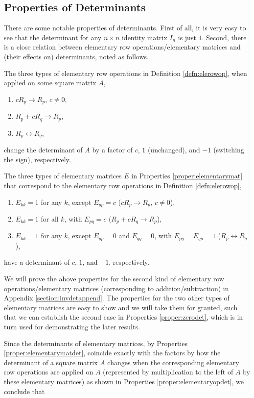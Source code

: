 \subsection{Properties of Determinants} There are some notable properties of determinants. First of all, it is very easy to see that the determinant for any $n \times n$ identity matrix $I_n$ is just $1$. Second, there is a close relation between elementary row operations/elementary matrices and (their effects on) determinants, noted as follows.
\begin{proper}
\label{proper:elementaryopdet}
The three types of elementary row operations in Definition \ref{defn:elerowop}, when applied on some square matrix $A$,
\begin{enumerate}
\item $cR_{p} \to R_{p}$, $c \neq 0$,
\item $R_{p} + cR_{q} \to R_{p}$,
\item $R_{p} \leftrightarrow R_{q}$,
\end{enumerate}
change the determinant of $A$ by a factor of $c$, $1$ (unchanged), and $-1$ (switching the sign), respectively.
\end{proper}
\begin{proper}
\label{proper:elementarymatdet}
The three types of elementary matrices $E$ in Properties \ref{proper:elementarymat} that correspond to the elementary row operations in Definition \ref{defn:elerowop},
\begin{enumerate}
\item $E_{kk} = 1$ for any $k$, except $E_{pp} = c$ ($cR_{p} \to R_{p}$, $c \neq 0$),
\item $E_{kk} = 1$ for all $k$, with $E_{pq} = c$ ($R_{p} + cR_{q} \to R_{p}$),
\item $E_{kk} = 1$ for any $k$, except $E_{pp} = 0$ and $E_{qq} = 0$, with $E_{pq} = E_{qp} = 1$ ($R_{p} \leftrightarrow R_{q}$),
\end{enumerate}
have a determinant of $c$, $1$, and $-1$, respectively.
\end{proper}
We will prove the above properties for the second kind of elementary row
operations/elementary matrices (corresponding to addition/subtraction) in Appendix \ref{section:invdetappend}. The properties for the two other types of elementary matrices are easy to show and we will take them for granted, such that we can establish the second case in Properties \ref{proper:zerodet}, which is in turn used for demonstrating the later results.\par
Since the determinants of elementary matrices, by Properties \ref{proper:elementarymatdet}, coincide exactly with the factors by how the determinant of a square matrix $A$ changes when the corresponding elementary row operations are applied on $A$ (represented by multiplication to the left of $A$ by these elementary matrices) as shown in Properties \ref{proper:elementaryopdet}, we conclude that
